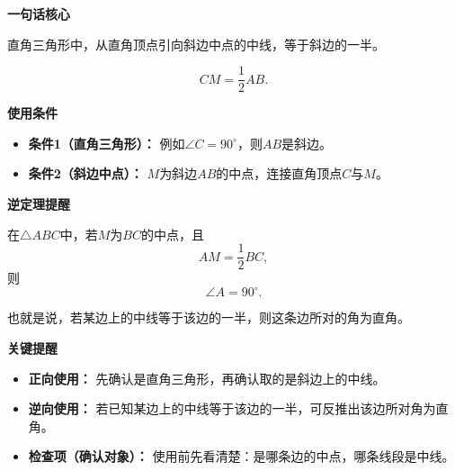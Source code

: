 \begin{summarybox}
	\textbf{\textcolor{CSummary}{一句话核心}}

	直角三角形中，从直角顶点引向斜边中点的中线，等于斜边的一半。

	\[
		CM=\frac12 AB.
	\]

	\medskip
	\textbf{\textcolor{CSummary}{使用条件}}
	\begin{itemize}[leftmargin=*, itemsep=0.5em, topsep=0.4em]
		\item \textbf{条件1（直角三角形）：} 例如$\angle C = 90^\circ$，则$AB$是斜边。
		\item \textbf{条件2（斜边中点）：} $M$为斜边$AB$的中点，连接直角顶点$C$与$M$。
	\end{itemize}

	\medskip
	\textbf{\textcolor{CSummary}{逆定理提醒}}

	在$\triangle ABC$中，若$M$为$BC$的中点，且
	\[
		AM=\frac12BC,
	\]
	则
	\[
		\angle A=90^\circ.
	\]

	也就是说，若某边上的中线等于该边的一半，则这条边所对的角为直角。

	\medskip
	\textbf{\textcolor{CSummary}{关键提醒}}
	\begin{itemize}[leftmargin=*, itemsep=0.5em, topsep=0.4em]
		\item \textbf{正向使用：} 先确认是直角三角形，再确认取的是斜边上的中线。
		\item \textbf{逆向使用：} 若已知某边上的中线等于该边的一半，可反推出该边所对角为直角。
		\item \textbf{检查项（确认对象）：} 使用前先看清楚：是哪条边的中点，哪条线段是中线。
	\end{itemize}
\end{summarybox}